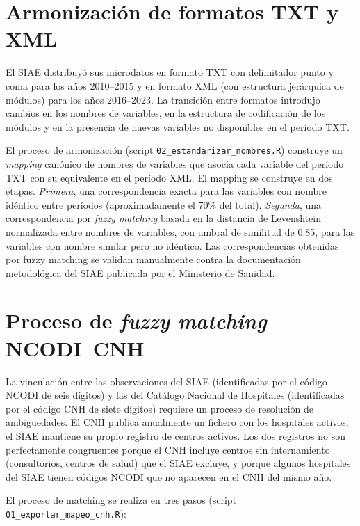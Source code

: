 \section{Armonización de formatos TXT y XML}
\label{sec:armonizacion_txt_xml_b}

El SIAE distribuyó sus microdatos en formato TXT con delimitador punto y coma para los años 2010--2015 y en formato XML (con estructura jerárquica de módulos) para los años 2016--2023. La transición entre formatos introdujo cambios en los nombres de variables, en la estructura de codificación de los módulos y en la presencia de nuevas variables no disponibles en el período TXT.

El proceso de armonización (script \texttt{02\_estandarizar\_nombres.R}) construye un \textit{mapping} canónico de nombres de variables que asocia cada variable del período TXT con su equivalente en el período XML. El mapping se construye en dos etapas. \textit{Primera}, una correspondencia exacta para las variables con nombre idéntico entre períodos (aproximadamente el 70\% del total). \textit{Segunda}, una correspondencia por \textit{fuzzy matching} basada en la distancia de Levenshtein normalizada entre nombres de variables, con umbral de similitud de 0.85, para las variables con nombre similar pero no idéntico. Las correspondencias obtenidas por fuzzy matching se validan manualmente contra la documentación metodológica del SIAE publicada por el Ministerio de Sanidad.

\section{Proceso de \textit{fuzzy matching} NCODI--CNH}
\label{sec:fuzzy_matching_cnh}

La vinculación entre las observaciones del SIAE (identificadas por el código NCODI de seis dígitos) y las del Catálogo Nacional de Hospitales (identificadas por el código CNH de siete dígitos) requiere un proceso de resolución de ambigüedades. El CNH publica anualmente un fichero con los hospitales activos; el SIAE mantiene su propio registro de centros activos. Los dos registros no son perfectamente congruentes porque el CNH incluye centros sin internamiento (consultorios, centros de salud) que el SIAE excluye, y porque algunos hospitales del SIAE tienen códigos NCODI que no aparecen en el CNH del mismo año.

El proceso de matching se realiza en tres pasos (script \texttt{01\_exportar\_mapeo\_cnh.R}):

